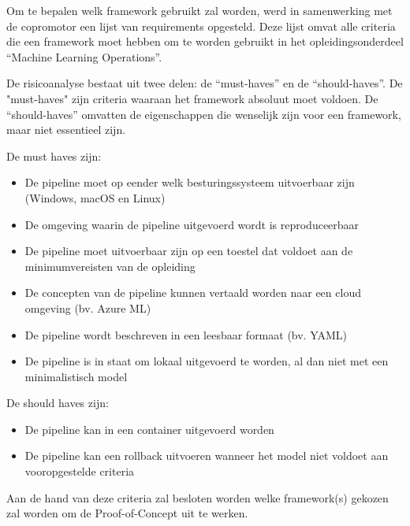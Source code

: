 Om te bepalen welk framework gebruikt zal worden, werd in samenwerking met de copromotor een lijst van requirements opgesteld. Deze lijst omvat alle criteria die een framework moet hebben om te worden gebruikt in het opleidingsonderdeel ``Machine Learning Operations''.


De risicoanalyse bestaat uit twee delen: de ``must-haves'' en de ``should-haves''. De "must-haves" zijn criteria waaraan het framework absoluut moet voldoen. De ``should-haves'' omvatten de eigenschappen die wenselijk zijn voor een framework, maar niet essentieel zijn.

De must haves zijn:
\begin{itemize}
    \item De pipeline moet op eender welk besturingssysteem uitvoerbaar zijn (Windows, macOS en Linux)
    \item De omgeving waarin de pipeline uitgevoerd wordt is reproduceerbaar
    \item De pipeline moet uitvoerbaar zijn op een toestel dat voldoet aan de minimumvereisten van de opleiding
    \item De concepten van de pipeline kunnen vertaald worden naar een cloud omgeving (bv. Azure ML)
    \item De pipeline wordt beschreven in een leesbaar formaat (bv. YAML)
    \item De pipeline is in staat om lokaal uitgevoerd te worden, al dan niet met een minimalistisch model
\end{itemize}
De should haves zijn:
\begin{itemize}
    \item De pipeline kan in een container uitgevoerd worden
    \item De pipeline kan een rollback uitvoeren wanneer het model niet voldoet aan vooropgestelde criteria
\end{itemize}

Aan de hand van deze criteria zal besloten worden welke framework(s) gekozen zal worden om de Proof-of-Concept uit te werken.


